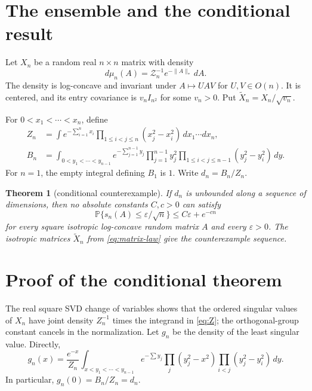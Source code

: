 \documentclass[11pt]{article}
\newtheorem{theorem}{Theorem}
\newcommand{\Pp}{\mathbb P}
\begin{document}
\section*{The ensemble and the conditional result}

Let $X_n$ be a random real $n\times n$ matrix with density
\begin{equation}\label{eq:matrix-law}
 d\mu_n(A)=\mathcal Z_n^{-1}e^{-\|A\|_*}\,dA.
\end{equation}
The density is log-concave and invariant under $A\mapsto UAV$ for
$U,V\in O(n)$.  It is centered, and its entry covariance is $v_n I_{n^2}$ for
some $v_n>0$.  Put $\widetilde X_n=X_n/\sqrt{v_n}$.

For $0<x_1<\cdots<x_n$, define
\begin{align}
 Z_n&=\int e^{-\sum_{i=1}^n x_i}
       \prod_{1\leq i<j\leq n}(x_j^2-x_i^2)\,dx_1\cdots dx_n,\label{eq:Z}\\
 B_n&=\int_{0<y_1<\cdots<y_{n-1}} e^{-\sum_{j=1}^{n-1}y_j}
       \prod_{j=1}^{n-1}y_j^2
       \prod_{1\leq i<j\leq n-1}(y_j^2-y_i^2)\,dy.\label{eq:B}
\end{align}
For $n=1$, the empty integral defining $B_1$ is $1$.  Write
$d_n=B_n/Z_n$.

\begin{theorem}[conditional counterexample]\label{thm:conditional}
If $d_n$ is unbounded along a sequence of dimensions, then no absolute
constants $C,c>0$ can satisfy
\[
 \Pp\{s_n(A)\leq\varepsilon/\sqrt n\}
 \leq C\varepsilon+e^{-cn}
\]
for every square isotropic log-concave random matrix $A$ and every
$\varepsilon>0$.  The isotropic matrices $\widetilde X_n$ from
\eqref{eq:matrix-law} give the counterexample sequence.
\end{theorem}

\section*{Proof of the conditional theorem}

The real square SVD change of variables shows that the ordered singular values
of $X_n$ have joint density $Z_n^{-1}$ times the integrand in
\eqref{eq:Z}; the orthogonal-group constant cancels in the normalization.
Let $g_n$ be the density of the least singular value.  Directly,
\begin{equation}\label{eq:g}
 g_n(x)=\frac{e^{-x}}{Z_n}
 \int_{x<y_1<\cdots<y_{n-1}}e^{-\sum y_j}
 \prod_j(y_j^2-x^2)\prod_{i<j}(y_j^2-y_i^2)\,dy.
\end{equation}
In particular, $g_n(0)=B_n/Z_n=d_n$.
\end{document}
